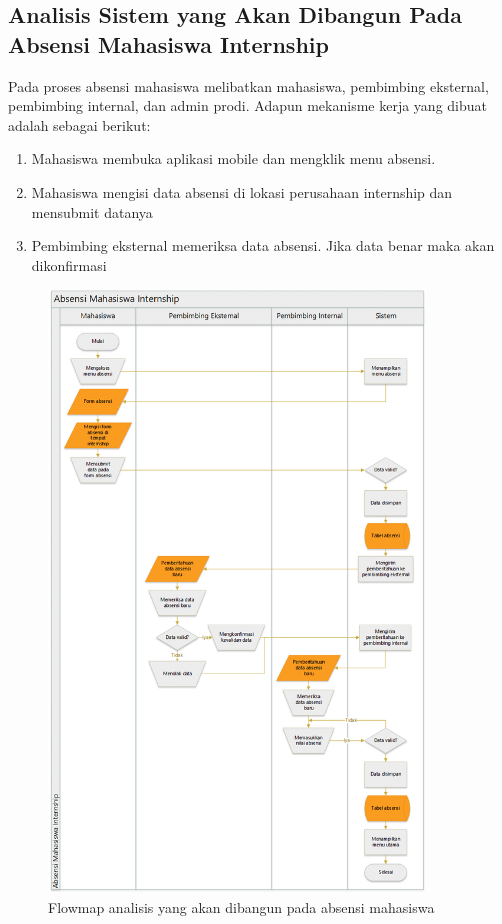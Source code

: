 \subsection{Analisis Sistem yang Akan Dibangun Pada Absensi Mahasiswa Internship}
Pada proses absensi mahasiswa melibatkan mahasiswa, pembimbing eksternal, pembimbing internal, dan admin prodi. Adapun mekanisme kerja yang dibuat adalah sebagai berikut:
\begin{enumerate}
	\item Mahasiswa membuka aplikasi mobile dan mengklik menu absensi.
	\item Mahasiswa mengisi data absensi di lokasi perusahaan internship dan mensubmit datanya
	\item Pembimbing eksternal memeriksa data absensi. Jika data benar maka akan dikonfirmasi
\end{enumerate}
	\begin{figure}[H]
		\includegraphics[width=10cm]{figures/image021.png}
		\centering
		\caption{Flowmap analisis yang akan dibangun pada absensi mahasiswa}
	\end{figure}
